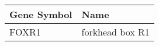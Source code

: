 \begin{tabular}{ll}
\toprule
Gene Symbol &            Name \\
\midrule
      FOXR1 & forkhead box R1 \\
\bottomrule
\end{tabular}
